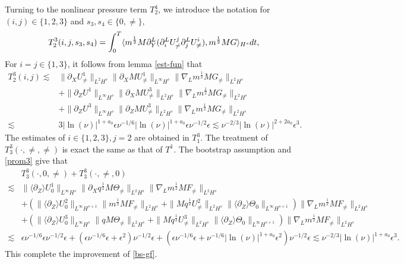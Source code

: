 \documentclass[12pt]{article}
\newcommand{\wtb}{\langle\partial_Z\rangle }
\numberwithin{equation}{section}
\begin{document}
	Turning to the nonlinear pressure term $T^4_2$, we introduce the notation for $(i,j)\in\{1,2,3\}$ and $s_3,s_4\in\{0,\neq\}$,
	\begin{equation*}
		T^3_2(i,j,s_3,s_4)=\int_{0}^{T}\langle m^{\frac{1}{2}}M\partial_Y^L(\partial^L_i U^j_{\neq} \partial^L_j U^i_{\neq}),m^{\frac{1}{2}}MG\rangle_{H^s} dt,\\
	\end{equation*}
	For $i=j\in\{1,3\}$, it follows from lemma \eqref{est-fun} that
	\begin{align*}
		T^3_2(i,j)\lesssim&\|\partial_XU^1_{\neq}\|_{L^2H^s}\|\partial_XMU^1_{\neq}\|_{L^\infty H^s}\|\nabla_Lm^{\frac{1}{2}}MG_{\neq}\|_{L^2H^s}\\
		&+\|\partial_ZU^1\|_{L^\infty H^s}\|\partial_XMU^3_{\neq}\|_{L^2H^s}\|\nabla_Lm^{\frac{1}{2}}MG_{\neq}\|_{L^2H^s}\\
		&+\|\partial_ZU^3\|_{L^\infty H^s}\|\partial_ZMU^3_{\neq}\|_{L^2H^s}\|\nabla_Lm^{\frac{1}{2}}MG_{\neq}\|_{L^2H^s}\\
		\lesssim&3|\ln(\nu)|^{1+a_0}\epsilon\nu^{-1/6}|\ln(\nu)|^{1+a_0}\epsilon\nu^{-1/2}\epsilon\lesssim\nu^{-2/3}|\ln(\nu)|^{2+2a_0}\epsilon^3.
	\end{align*}
	The estimates of $i\in\{1,2,3\},j=2$ are obtained in $T^3_1$. The treatment of $T^3_3(\cdot,\neq,\neq)$ is exact the same as that of $T^1$. The bootstrap assumption and \eqref{prom3} give that
	\begin{align*}
		&T^3_3(\cdot,0,\neq)+T^3_3(\cdot,\neq,0)\\
		\lesssim&\|\wtb U^1_0\|_{L^\infty H^{s}}\|\partial_Xq^{\frac{1}{2}}M\Theta_{\neq}\|_{L^2H^s}\|\nabla_Lm^{\frac{1}{2}}MF_{\neq}\|_{L^2H^s}\\
		&+(\|\wtb U^2_0\|_{L^\infty H^{s+1}}\| m^{\frac{1}{2}}MF_{\neq}\|_{L^2H^s}+
		\|Mq^{\frac{1}{2}}U^2_{\neq}\|_{L^2H^s}\|\wtb \Theta_0\|_{L^\infty H^{s+1}})\|\nabla_Lm^{\frac{1}{2}}MF_{\neq}\|_{L^2H^s}\\
		&+ (\|\wtb U^3_0\|_{L^\infty H^{s}}\| qM\Theta_{\neq}\|_{L^2H^s}+\|Mq^{\frac{1}{2}}U^3_{\neq}\|_{L^2H^s}\|\wtb \Theta_0\|_{L^\infty H^{s+1}})\|\nabla_Lm^{\frac{1}{2}}MF_{\neq}\|_{L^2H^s}\\
		\lesssim&\epsilon\nu^{-1/6}\epsilon\nu^{-1/2}\epsilon+(\epsilon\nu^{-1/6}\epsilon+\epsilon^2)\nu^{-1/2}\epsilon+(\epsilon\nu^{-1/6}\epsilon+\nu^{-1/6}|\ln(\nu)|^{1+a_0}\epsilon^2)\nu^{-1/2}\epsilon\lesssim\nu^{-2/3}|\ln(\nu)|^{1+a_0}\epsilon^3.
	\end{align*}
	This complete the improvement of \eqref{bs-gf}.
	
\end{document}

